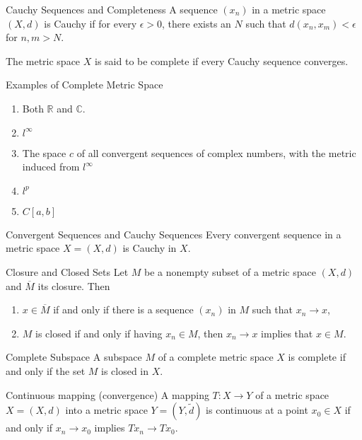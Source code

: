 \documentclass[avery5388,grid,frame]{flashcards}
\begin{document}
\begin{flashcard}[Definition]{Cauchy Sequences and Completeness}
A sequence $(x_n)$ in a metric space $(X,d)$ is Cauchy if for every $\epsilon>0$, there exists an $N$ such that $d(x_n,x_m)<\epsilon$ for $n,m>N$. 

The metric space $X$ is said to be complete if every Cauchy sequence converges.
\end{flashcard}

\begin{flashcard}[Example]{Examples of Complete Metric Space}
\begin{enumerate}
\item Both $\mathbb{R}$ and $\mathbb{C}$.
\item $l^\infty$
\item The space $c$ of all convergent sequences of complex numbers, with the metric induced from $l^\infty$
\item $l^p$
\item $C[a,b]$
\end{enumerate}
\end{flashcard}

\begin{flashcard}[Theorem]{Convergent Sequences and Cauchy Sequences}
Every convergent sequence in a metric space $X=(X,d)$ is Cauchy in $X$.
\end{flashcard}

\begin{flashcard}[Theorem]{Closure and Closed Sets}
Let $M$ be a nonempty subset of a metric space $(X,d)$ and $\overline{M}$ its closure. Then
\begin{enumerate}
\item $x\in\overline{M}$ if and only if there is a sequence $(x_n)$ in $M$ such that $x_n\rightarrow x$,
\item $M$ is closed if and only if having $x_n\in M$, then $x_n\rightarrow x$ implies that $x\in M$.
\end{enumerate}
\end{flashcard}

\begin{flashcard}[Theorem]{Complete Subspace}
A subspace $M$ of a complete metric space $X$ is complete if and only if the set $M$ is closed in $X$.
\end{flashcard}

\begin{flashcard}[Theorem]{Continuous mapping (convergence)}
A mapping $T\colon X\rightarrow Y$ of a metric space $X=(X,d)$ into a metric space $Y=(Y,\widetilde{d})$ is continuous at a point $x_0\in X$ if and only if $x_n\rightarrow x_0$ implies $Tx_n\rightarrow Tx_0$.
\end{flashcard}
\end{document}
